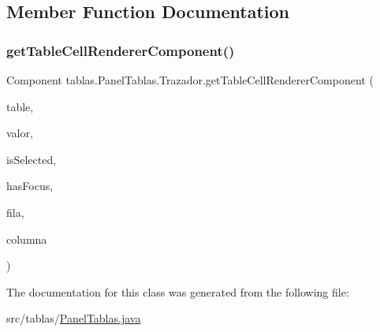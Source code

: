 \subsection{Member Function Documentation}
\mbox{\label{classtablas_1_1_panel_tablas_1_1_trazador_acec33235cbf2fb884f8b2de3400ab6f8}} 
\subsubsection{\texorpdfstring{get\+Table\+Cell\+Renderer\+Component()}{getTableCellRendererComponent()}}
{\footnotesize\ttfamily Component tablas.\+Panel\+Tablas.\+Trazador.\+get\+Table\+Cell\+Renderer\+Component (\begin{DoxyParamCaption}\item[{J\+Table}]{table,  }\item[{Object}]{valor,  }\item[{boolean}]{is\+Selected,  }\item[{boolean}]{has\+Focus,  }\item[{int}]{fila,  }\item[{int}]{columna }\end{DoxyParamCaption})}



The documentation for this class was generated from the following file\+:\begin{DoxyCompactItemize}
\item 
src/tablas/\mbox{\hyperlink{_panel_tablas_8java}{Panel\+Tablas.\+java}}\end{DoxyCompactItemize}
